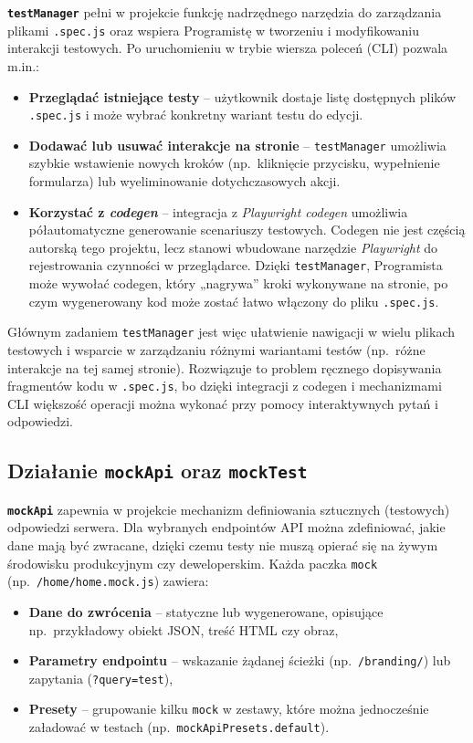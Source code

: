 \documentclass[12pt]{report}
\begin{document}
\textbf{\texttt{testManager}} pełni w projekcie funkcję nadrzędnego narzędzia do zarządzania plikami \texttt{.spec.js} oraz wspiera Programistę w tworzeniu i modyfikowaniu interakcji testowych. Po uruchomieniu w trybie wiersza poleceń (CLI) pozwala m.in.:
\begin{itemize}
   \item \textbf{Przeglądać istniejące testy} -- użytkownik dostaje listę dostępnych plików \texttt{.spec.js} i może wybrać konkretny wariant testu do edycji.
   \item \textbf{Dodawać lub usuwać interakcje na stronie} -- \texttt{testManager} umożliwia szybkie wstawienie nowych kroków (np.~kliknięcie przycisku, wypełnienie formularza) lub wyeliminowanie dotychczasowych akcji.
   \item \textbf{Korzystać z \emph{codegen}} -- integracja z \emph{Playwright codegen} umożliwia półautomatyczne generowanie scenariuszy testowych. Codegen nie jest częścią autorską tego projektu, lecz stanowi wbudowane narzędzie \emph{Playwright} do rejestrowania czynności w przeglądarce. Dzięki \texttt{testManager}, Programista może wywołać codegen, który „nagrywa” kroki wykonywane na stronie, po czym wygenerowany kod może zostać łatwo włączony do pliku \texttt{.spec.js}.
\end{itemize}

Głównym zadaniem \texttt{testManager} jest więc ułatwienie nawigacji w wielu plikach testowych i wsparcie w zarządzaniu różnymi wariantami testów (np.~różne interakcje na tej samej stronie). Rozwiązuje to problem ręcznego dopisywania fragmentów kodu w \texttt{.spec.js}, bo dzięki integracji z codegen i mechanizmami CLI większość operacji można wykonać przy pomocy interaktywnych pytań i odpowiedzi.

\subsection{Działanie \texttt{mockApi} oraz \texttt{mockTest}}
\label{sec:dzialanie-mocki}

\textbf{\texttt{mockApi}} zapewnia w projekcie mechanizm definiowania sztucznych (testowych) odpowiedzi serwera. Dla wybranych endpointów API można zdefiniować, jakie dane mają być zwracane, dzięki czemu testy nie muszą opierać się na żywym środowisku produkcyjnym czy deweloperskim. Każda paczka \texttt{mock} (np.~\texttt{/home/home.mock.js}) zawiera:
\begin{itemize}
   \item \textbf{Dane do zwrócenia} -- statyczne lub wygenerowane, opisujące np.~przykładowy obiekt JSON, treść HTML czy obraz,
   \item \textbf{Parametry endpointu} -- wskazanie żądanej ścieżki (np.~\texttt{/branding/}) lub zapytania (\texttt{?query=test}),
   \item \textbf{Presety} -- grupowanie kilku \texttt{mock} w zestawy, które można jednocześnie załadować w testach (np.~\texttt{mockApiPresets.default}).
\end{itemize}
\end{document}
